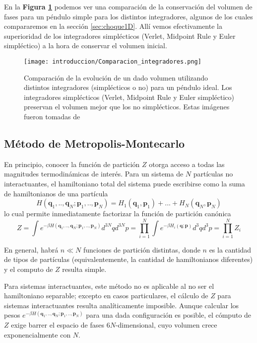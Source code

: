 En la \textbf{Figura \ref{fig:comp_integ_gatito}} podemos ver una comparación de la conservación del volumen de fases para un péndulo simple para los distintos integradores, algunos de los cuales 
compararemos en la sección \ref{sec:choque1D}.
Allí vemos efectivamente la superioridad de los integradores simplécticos (Verlet, Midpoint Rule y Euler simpléctico) a la hora de conservar el volumen inicial.

\begin{figure}[H]
	\centering	%
	\texttt{[image: introduccion/Comparacion\_integradores.png]}
	\caption{Comparación de la evolución de un dado volumen utilizando distintos integradores (simplécticos o no) para un péndulo ideal.
		Los integradores simplécticos (Verlet, Midpoint Rule y Euler simpléctico) preservan el volumen mejor que los no simplécticos.
		Estas imágenes fueron tomadas de \cite[pp. 188]{BOOK:SPR_INT}}
	\label{fig:comp_integ_gatito}
\end{figure}

\subsection{Método de Metropolis-Montecarlo}

En principio, conocer la función de partición $Z$ otorga acceso a todas las magnitudes termodinámicas de interés.
Para un sistema de $N$ partículas no interactuantes, el hamiltoniano total del sistema puede escribirse como la suma de hamiltonianos de una partícula
\[H(\mathbf{q}_1,..,\mathbf{q}_N;\mathbf{p}_1,..,\mathbf{p}_N) = H_1(\mathbf{q}_1, \mathbf{p}_1) + ... +H_N(\mathbf{q}_N, \mathbf{p}_N)\]
lo cual permite inmediatamente factorizar la función de partición canónica
\[ Z = \int e^{-\beta H(\mathbf{q}_1,..,\mathbf{q}_N;\mathbf{p}_1,..,\mathbf{p}_N)} d^{3N}qd^{3N}p = \prod_{i=1}^N \int e^{-\beta H_i(\mathbf{q};\mathbf{p})} d^{3}qd^{3}p = \prod_{i=1}^N Z_i \]

En general, habrá $n\ll N$ funciones de partición distintas, donde $n$ es la cantidad de tipos de partículas (equivalentemente, la cantidad de hamiltonianos diferentes) y el computo de $Z$ resulta simple.

Para sistemas interactuantes, este método no es aplicable al no ser el hamiltoniano separable; excepto en casos particulares, el cálculo de $Z$ para sistemas interactuantes resulta analíticamente imposible.
Aunque calcular los pesos $e^{-\beta H(\mathbf{q}_1,..,\mathbf{q}_N;\mathbf{p}_1,..,\mathbf{p}_N)}$ para una dada configuración es posible, el cómputo de $Z$ exige barrer el espacio de fases $6N$-dimensional,
cuyo volumen crece exponencialmente con $N$.

